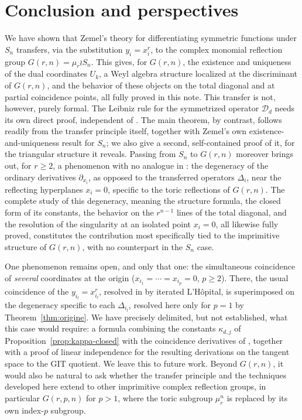 \documentclass[11pt]{article}
\theoremstyle{remark}
\begin{document}
\section{Conclusion and perspectives}

We have shown that Zemel's theory \cite{Ze} for differentiating symmetric functions under $S_n$ transfers, via the substitution $y_i=x_i^r$, to the complex monomial reflection group $G(r,n)=\mu_r\wr S_n$. This gives, for $G(r,n)$, the existence and uniqueness of the dual coordinates $U_k$, a Weyl algebra structure localized at the discriminant of $G(r,n)$, and the behavior of these objects on the total diagonal and at partial coincidence points, all fully proved in this note. This transfer is not, however, purely formal. The Leibniz rule for the symmetrized operator $\mathcal D_d$ needs its own direct proof, independent of \cite{Ze}. The main theorem, by contrast, follows readily from the transfer principle itself, together with Zemel's own existence-and-uniqueness result for $S_n$; we also give a second, self-contained proof of it, for the triangular structure it reveals. Passing from $S_n$ to $G(r,n)$ moreover brings out, for $r\ge2$, a phenomenon with no analogue in \cite{Ze}: the degeneracy of the ordinary derivatives $\partial_{x_i}$, as opposed to the transferred operators $\Delta_i$, near the reflecting hyperplanes $x_i=0$, specific to the toric reflections of $G(r,n)$. The complete study of this degeneracy, meaning the structure formula, the closed form of its constants, the behavior on the $r^{n-1}$ lines of the total diagonal, and the resolution of the singularity at an isolated point $x_i=0$, all likewise fully proved, constitutes the contribution most specifically tied to the imprimitive structure of $G(r,n)$, with no counterpart in the $S_n$ case.

One phenomenon remains open, and only that one: the simultaneous coincidence of \emph{several} coordinates at the origin ($x_{i_1}=\cdots=x_{i_p}=0$, $p\ge2$). There, the usual coincidence of the $y_{i_l}=x_{i_l}^r$, resolved in \cite{Ze} by iterated L'Hôpital, is superimposed on the degeneracy specific to each $\Delta_{i_l}$, resolved here only for $p=1$ by Theorem~\ref{thm:origine}. We have precisely delimited, but not established, what this case would require: a formula combining the constants $\kappa_{d,j}$ of Proposition~\ref{prop:kappa-closed} with the coincidence derivatives of \cite{Ze}, together with a proof of linear independence for the resulting derivations on the tangent space to the GIT quotient. We leave this to future work. Beyond $G(r,n)$, it would also be natural to ask whether the transfer principle and the techniques developed here extend to other imprimitive complex reflection groups, in particular $G(r,p,n)$ for $p>1$, where the toric subgroup $\mu_r^n$ is replaced by its own index-$p$ subgroup.
\end{document}
